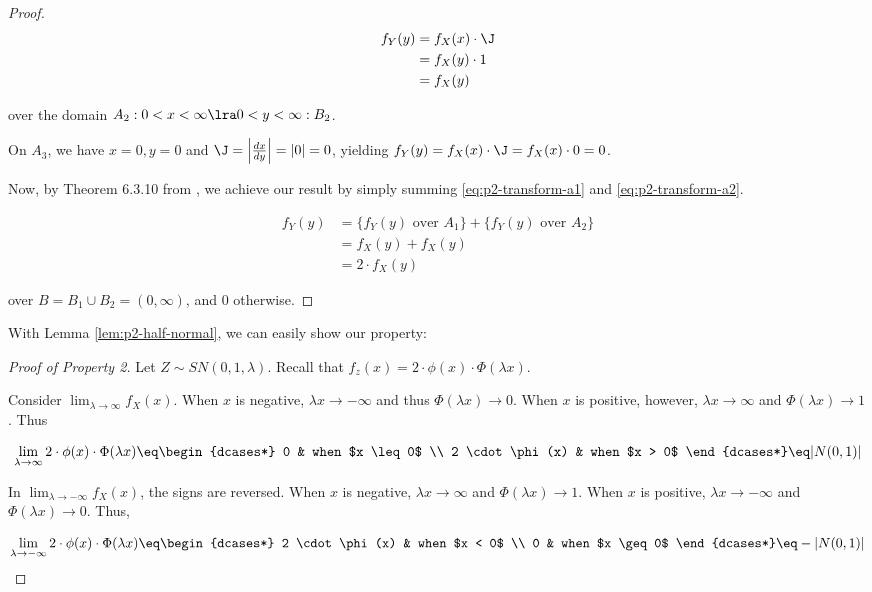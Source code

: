 \documentclass{article}
\begin{document}
\begin{proof}
  \begin{align}
    f_Y(y) &= f_X(x) \cdot \J \nonumber \\
    &= f_X(y) \cdot 1 \nonumber \\
    &= f_X(y) \label{eq:p2-transform-a2}
  \end{align}

  over the domain $A_2: 0 < x < \infty \lra 0 < y < \infty :B_2$.

  On $A_3$, we have $x = 0, y = 0$ and $\J = \left| \frac{dx}{dy} \right| = |0|
  = 0$, yielding $f_Y(y) = f_X(x) \cdot \J = f_X(x) \cdot 0 = 0$.

  Now, by Theorem 6.3.10 from \citet{textbook}, we achieve our result by simply
  summing \eqref{eq:p2-transform-a1} and \eqref{eq:p2-transform-a2}.

  \begin{align}
    f_Y(y) &= \{ f_Y(y) \textrm{ over } A_1 \} + \{ f_Y(y) \textrm{ over } A_2 \} \nonumber \\
    &= f_X(y) + f_X(y) \nonumber \\
    &= 2 \cdot f_X(y) \label{eq:p2-transform-result}
  \end{align}

  over $B = B_1 \cup B_2 = (0, \infty)$, and 0 otherwise.
\end{proof}

With Lemma \ref{lem:p2-half-normal}, we can easily show our property:

\begin{proof}[Proof of Property 2]
  Let $Z \sim SN(0,1,\lambda)$. Recall that $f_z(x) = 2 \cdot \phi(x) \cdot
  \Phi(\lambda x)$.

  Consider $\lim_{\lambda \to \infty} f_X(x)$. When $x$ is negative, $\lambda x
  \to -\infty$ and thus $\Phi(\lambda x) \to 0$. When $x$ is positive, however,
  $\lambda x \to \infty$ and $\Phi(\lambda x) \to 1$. Thus

  \begin{equation}
    \label{eq:p2-positive-half-normal}
    \lim_{\lambda \to \infty} 2 \cdot \phi(x) \cdot \Phi(\lambda x) \eq
    \begin{dcases*}
      0 & when $x \leq 0$ \\
      2 \cdot \phi(x) & when $x > 0$
    \end{dcases*}
    \eq |N(0,1)|
  \end{equation}

  In $\lim_{\lambda \to -\infty} f_X(x)$, the signs are reversed. When $x$ is
  negative, $\lambda x \to \infty$ and $\Phi(\lambda x) \to 1$. When $x$ is
  positive, $\lambda x \to -\infty$ and $\Phi(\lambda x) \to 0$. Thus,

  \begin{equation}
    \label{eq:p2-negative-half-normal}
    \lim_{\lambda \to -\infty} 2 \cdot \phi(x) \cdot \Phi(\lambda x) \eq
    \begin{dcases*}
      2 \cdot \phi(x) & when $x < 0$ \\
      0 & when $x \geq 0$
    \end{dcases*}
    \eq -|N(0,1)|
  \end{equation}
\end{proof}
\end{document}
